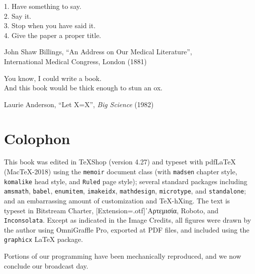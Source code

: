 \epigraph{1. Have something to say.\\2. Say it.\\3. Stop when you have said it.\\4. Give the paper a proper title.}{John Shaw Billings, “An Address on Our Medical Literature”,\\International Medical Congress, London (1881)}

\epigraph{You know, I could write a book.\\And this book would be thick enough to stun an ox.}{Laurie Anderson, “Let X=X”, \textit{Big Science} (1982)}

\chapter*{Colophon}

This book was edited in TeXShop (version 4.27) and typeset with pdf\LaTeX{} (MacTeX-2018) using the \texttt{memoir} document class (with \texttt{madsen} chapter style, \texttt{komalike} head style, and \texttt{Ruled} page style); several standard packages including \texttt{amsmath}, \texttt{babel}, \texttt{enumitem}, \texttt{imakeidx}, \texttt{mathdesign}, \texttt{microtype}, and \texttt{standalone}; and an embarrassing amount of customization and \TeX-hXing.
The text is typeset in Bitstream Charter, {[Extension=.otf]᾿Αρτεμισία}, \textsf{Roboto}, and \texttt{Inconsolata}.
Except as indicated in the Image Credits, all figures were drawn by the author using OmniGraffle Pro, exported at PDF files, and included using the \texttt{graphicx} \LaTeX{} package.

Portions of our programming have been mechanically reproduced, and we now conclude our broadcast day.
